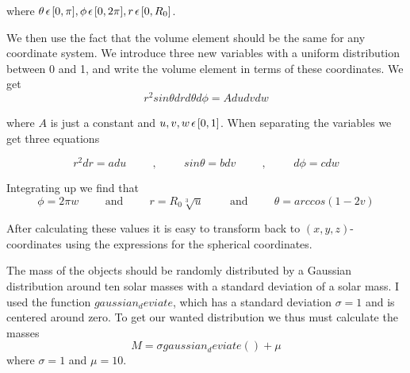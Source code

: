 \documentclass[a4paper,12pt, english]{article}
\begin{document}
where $ \theta \hspace{0.5mm} \epsilon \hspace{0.5mm} [0, \pi], \phi \hspace{0.5mm} \epsilon \hspace{0.5mm} [0, 2\pi], r \hspace{0.5mm} \epsilon \hspace{0.5mm} [0, R_0]$. 
 
We then use the fact that the volume element should be the same for any coordinate system. We introduce three new variables with a uniform distribution between 0 and 1, and write the volume element in terms of these coordinates. We get
\[
r^2 sin \theta dr d \theta d \phi = Adudvdw
\]

where $A$ is just a constant and $u, v, w \hspace{0.5mm} \epsilon \hspace{0.5mm} [0,1]$. When separating the variables we get three equations   

\[
r^2dr = adu \hspace{1cm}\mathrm{,}\hspace{1cm}
sin \theta = bdv \hspace{1cm}\mathrm{,}\hspace{1cm}
d \phi = cdw
\]

Integrating up we find that
\[
\phi = 2 \pi w  \hspace{1cm}\mathrm{and}\hspace{1cm}
r = R_0 \sqrt[3]{u}  \hspace{1cm}\mathrm{and}\hspace{1cm}
   \theta = arccos(1-2v) 
\]

After calculating these values it is easy to transform back to $(x,y,z)$-coordinates using the expressions for the spherical coordinates.


The mass of the objects should be randomly distributed by a Gaussian distribution around ten solar masses with a standard deviation of a solar mass. I used the function $gaussian_deviate$, which has a standard deviation $ \sigma = 1$ and is centered around zero. To get our wanted distribution we thus must calculate the masses   
$$ M = \sigma gaussian_deviate() + \mu $$
where $\sigma = 1$ and $\mu = 10$. 

\begin{lstlisting}[title={Initial conditions for the N-body system}]
 
 

 
\end{lstlisting}
\end{document}
